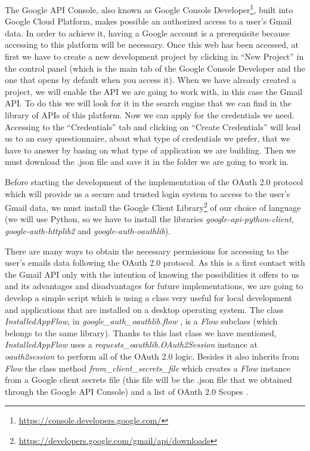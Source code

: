 The Google API Console, also known as Google Console Developer\footnote{\url{https://console.developers.google.com/}}, built into Google Cloud Platform, makes possible an authorized access to a user's Gmail data. In order to achieve it, having a Google account is a prerequisite because accessing to this platform will be necessary. Once this web has been accessed, at first we have to create a new development project by clicking in ``New Project'' in the control panel (which is the main tab of the Google Console Developer and the one that opens by default when you access it). When we have already created a project, we will enable the API we are going to work with, in this case the Gmail API. To do this we will look for it in the search engine that we can find in the library of APIs of this platform. Now we can apply for the credentials we need. Accessing to the ``Credentials'' tab and clicking on ``Create Credentials'' will lead us to an easy questionnaire, about what type of credentials we prefer, that we have to answer by basing on what type of application we are building. Then we must download the .json file and save it in the folder we are going to work in.

Before starting the development of the implementation of the OAuth 2.0 protocol which will provide us a secure and trusted login system to access to the user's Gmail data, we must install the Google Client Library\footnote{\url{https://developers.google.com/gmail/api/downloads}} of our choice of language (we will use Python, so we have to install the libraries \textit{google-api-python-client}, \textit{google-auth-httplib2} and \textit{google-auth-oauthlib}).

There are many ways to obtain the necessary permissions for accessing to the user's emails data following the OAuth 2.0 protocol. As this is a first contact with the Gmail API only with the intention of knowing the possibilities it offers to us and its advantages and disadvantages for future implementations, we are going to develop a simple script which is using a class very useful for local development and applications that are installed on a desktop operating system. The class \textit{InstalledAppFlow}, in \textit{google\_auth\_oauthlib.flow} \citep{oauthlib}, is a \textit{Flow} subclass (which belongs to the same library). Thanks to this last class we have mentioned, \textit{InstalledAppFlow} uses a \textit{requests\_oauthlib.OAuth2Session} instance at \textit{oauth2session} to perform all of the OAuth 2.0 logic. Besides it also inherits from \textit{Flow} the class method \textit{from\_client\_secrets\_file} which creates a \textit{Flow} instance from a Google client secrets file (this file will be the .json file that we obtained through the Google API Console) and a list of OAuth 2.0 Scopes \citep{oauth-scopes}.

